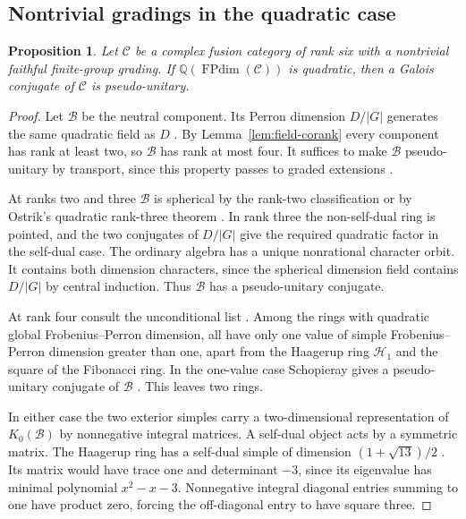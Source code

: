 \documentclass[11pt,reqno]{amsart}
\newtheorem{proposition}[theorem]{Proposition}
\theoremstyle{remark}\newtheorem{remark}[theorem]{Remark}
\numberwithin{equation}{section}
\begin{document}
\subsection{Nontrivial gradings in the quadratic case}
\begin{proposition}\label{prop:quadratic-graded-direct}
Let $\mathcal C$ be a complex fusion category of rank six with a nontrivial faithful finite-group grading. If $\mathbb Q(\operatorname{FPdim}(\mathcal C))$ is quadratic, then a Galois conjugate of $\mathcal C$ is pseudo-unitary.
\end{proposition}
\begin{proof}
Let $\mathcal B$ be the neutral component. Its Perron dimension
$D/|G|$ generates the same quadratic field as $D$
\cite[Proposition~8.20]{ENO}. By Lemma~\ref{lem:field-corank}
every component has rank at least two, so $\mathcal B$ has rank at
most four. It suffices to make $\mathcal B$ pseudo-unitary by
transport, since this property passes to graded extensions
\cite[Proposition~2.8]{BJ}.

At ranks two and three $\mathcal B$ is spherical by the rank-two
classification \cite{Ostrik2} or by Ostrik's quadratic rank-three
theorem \cite[Proposition~3.1 and Theorem~5.1]{Ostrik3}. In rank
three the non-self-dual ring is pointed, and the two conjugates of
$D/|G|$ give the required quadratic factor in the self-dual case.
The ordinary algebra has a unique nonrational character orbit.
It contains both dimension characters, since the spherical dimension
field contains $D/|G|$ by central induction. Thus $\mathcal B$ has
a pseudo-unitary conjugate.

At rank four consult the unconditional list
\cite[Corollary~13.1 and Table~1]{Rank4Sphere}. Among the rings with
quadratic global Frobenius--Perron dimension, all have only one value
of simple Frobenius--Perron dimension greater than one, apart from the
Haagerup ring $\mathcal H_1$ and the square of the Fibonacci ring. In the
one-value case Schopieray gives a pseudo-unitary conjugate of
$\mathcal B$ \cite[Lemma~3.1]{SchopExt}. This leaves two rings.

In either case the two exterior simples carry a two-dimensional
representation of $K_0(\mathcal B)$ by nonnegative integral matrices.
A self-dual object acts by a symmetric matrix. The Haagerup ring
has a self-dual simple of dimension $(1+\sqrt{13})/2$
\cite[Table~2]{HaagGS}. Its matrix would have trace one and
determinant $-3$, since its eigenvalue has minimal polynomial
$x^2-x-3$. Nonnegative integral diagonal entries summing to one
have product zero, forcing the off-diagonal entry to have square three.


\end{proof}
\end{document}
